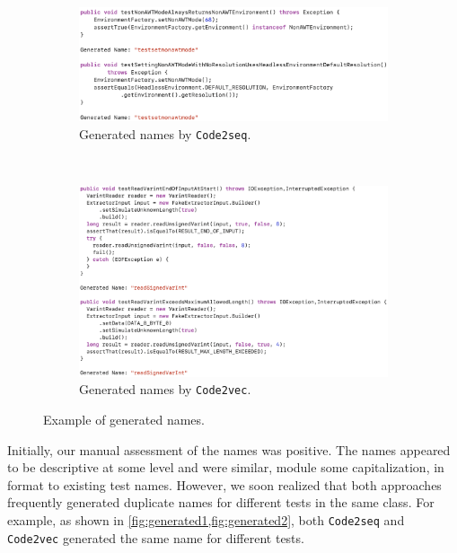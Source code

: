 \begin{appendices}
\begin{figure}[H]
\centering
\begin{subfigure}[b]{1.0\textwidth}
\centering
\includegraphics[scale=0.4]{figures/dup1.png}
\caption{Generated names by \texttt{Code2seq}.}
\label{fig:generated1}
\end{subfigure}\\
\vspace{0.2cm}
\begin{subfigure}[b]{1.0\textwidth}
\centering
\includegraphics[scale=0.4]{figures/dup2.png}
\caption{Generated names by \texttt{Code2vec}.}
\label{fig:generated2}
\end{subfigure}
\caption{Example of generated names.}
\label{fig:duplicate-names}
\end{figure}


Initially, our manual assessment of the names was positive.
%
The names appeared to be descriptive at some level and were similar, module some capitalization, in format to existing test names.
%
However, we soon realized that both approaches frequently generated duplicate names for different tests in the same class.
%
For example, as shown in \cref{fig:generated1,fig:generated2}, both \texttt{Code2seq} and \texttt{Code2vec} generated the same name for different tests.



\end{appendices}
